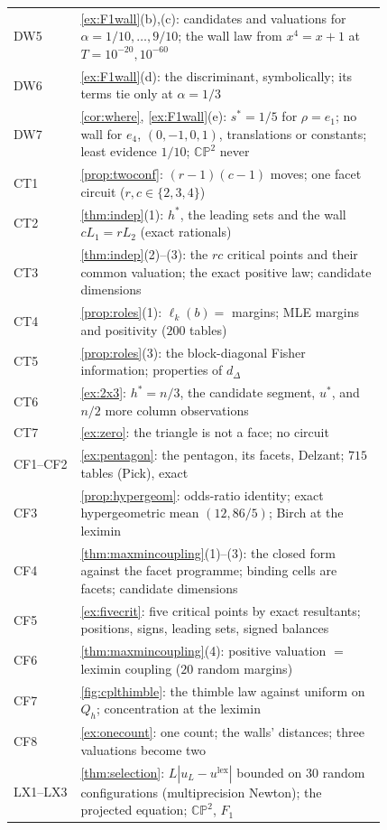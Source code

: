 \documentclass[11pt]{article}
\theoremstyle{definition}\newtheorem{definition}[theorem]{Definition}\newtheorem{remark}[theorem]{Remark}\newtheorem{example}[theorem]{Example}\newtheorem{problem}[theorem]{Open problem}\crefname{problem}{Problem}{Problems}
\begin{document}
{\begin{longtable}{lp{0.82\linewidth}}
DW5 & \cref{ex:F1wall}(b),(c): candidates and valuations for $\alpha=1/10,\dots,9/10$; the wall law from $x^4=x+1$ at $T=10^{-20},10^{-60}$\\
DW6 & \cref{ex:F1wall}(d): the discriminant, symbolically; its terms tie only at $\alpha=1/3$\\
DW7 & \cref{cor:where}, \cref{ex:F1wall}(e): $s^*=1/5$ for $\rho=e_1$; no wall for $e_4$, $(0,-1,0,1)$, translations or constants; least evidence $1/10$; $\mathbb{CP}^2$ never\\
CT1 & \cref{prop:twoconf}: $(r-1)(c-1)$ moves; one facet circuit ($r,c\in\{2,3,4\}$)\\
CT2 & \cref{thm:indep}(1): $h^*$, the leading sets and the wall $cL_1=rL_2$ (exact rationals)\\
CT3 & \cref{thm:indep}(2)--(3): the $rc$ critical points and their common valuation; the exact positive law; candidate dimensions\\
CT4 & \cref{prop:roles}(1): $\ell_k(b)=$ margins; MLE margins and positivity ($200$ tables)\\
CT5 & \cref{prop:roles}(3): the block-diagonal Fisher information; properties of $d_\Delta$\\
CT6 & \cref{ex:2x3}: $h^*=n/3$, the candidate segment, $u^*$, and $n/2$ more column observations\\
CT7 & \cref{ex:zero}: the triangle is not a face; no circuit\\
CF1--CF2 & \cref{ex:pentagon}: the pentagon, its facets, Delzant; $715$ tables (Pick), exact\\
CF3 & \cref{prop:hypergeom}: odds-ratio identity; exact hypergeometric mean $(12,86/5)$; Birch at the leximin\\
CF4 & \cref{thm:maxmincoupling}(1)--(3): the closed form against the facet programme; binding cells are facets; candidate dimensions\\
CF5 & \cref{ex:fivecrit}: five critical points by exact resultants; positions, signs, leading sets, signed balances\\
CF6 & \cref{thm:maxmincoupling}(4): positive valuation $=$ leximin coupling ($20$ random margins)\\
CF7 & \cref{fig:cplthimble}: the thimble law against uniform on $Q_h$; concentration at the leximin\\
CF8 & \cref{ex:onecount}: one count; the walls' distances; three valuations become two\\
LX1--LX3 & \cref{thm:selection}: $L|u_L-u^{\mathrm{lex}}|$ bounded on $30$ random configurations (multiprecision Newton); the projected equation; $\mathbb{CP}^2$, $F_1$\\

\end{longtable}}
\end{document}
